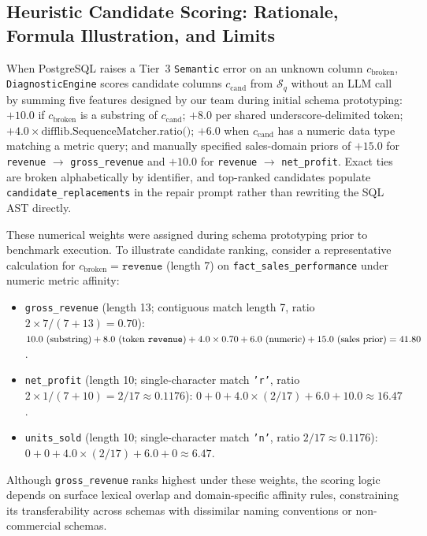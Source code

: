 \subsection{Heuristic Candidate Scoring: Rationale, Formula Illustration, and Limits}
When PostgreSQL raises a Tier~3 \texttt{Semantic} error on an unknown column $c_{\text{broken}}$, \texttt{DiagnosticEngine} scores candidate columns $c_{\text{cand}}$ from $\mathcal{S}_q$ without an LLM call by summing five features designed by our team during initial schema prototyping: $+10.0$ if $c_{\text{broken}}$ is a substring of $c_{\text{cand}}$; $+8.0$ per shared underscore-delimited token; $+4.0 \times \text{difflib.SequenceMatcher.ratio()}$; $+6.0$ when $c_{\text{cand}}$ has a numeric data type matching a metric query; and manually specified sales-domain priors of $+15.0$ for \texttt{revenue} $\to$ \texttt{gross\_\allowbreak{}revenue} and $+10.0$ for \texttt{revenue} $\to$ \texttt{net\_\allowbreak{}profit}. Exact ties are broken alphabetically by identifier, and top-ranked candidates populate \texttt{candidate\_\allowbreak{}replacements} in the repair prompt rather than rewriting the SQL AST directly.

These numerical weights were assigned during schema prototyping prior to benchmark execution. To illustrate candidate ranking, consider a representative calculation for $c_{\text{broken}} = \texttt{revenue}$ (length 7) on \texttt{fact\_sales\_performance} under numeric metric affinity:
\begin{itemize}
\item \texttt{gross\_revenue} (length 13; contiguous match length 7, ratio $2 \times 7 / (7 + 13) = 0.70$): $10.0\text{ (substring)} + 8.0\text{ (token \texttt{revenue})} + 4.0 \times 0.70 + 6.0\text{ (numeric)} + 15.0\text{ (sales prior)} = 41.80$.
\item \texttt{net\_profit} (length 10; single-character match \texttt{'r'}, ratio $2 \times 1 / (7 + 10) = 2/17 \approx 0.1176$): $0 + 0 + 4.0 \times (2/17) + 6.0 + 10.0 \approx 16.47$.
\item \texttt{units\_sold} (length 10; single-character match \texttt{'n'}, ratio $2/17 \approx 0.1176$): $0 + 0 + 4.0 \times (2/17) + 6.0 + 0 \approx 6.47$.
\end{itemize}
Although \texttt{gross\_revenue} ranks highest under these weights, the scoring logic depends on surface lexical overlap and domain-specific affinity rules, constraining its transferability across schemas with dissimilar naming conventions or non-commercial schemas.

